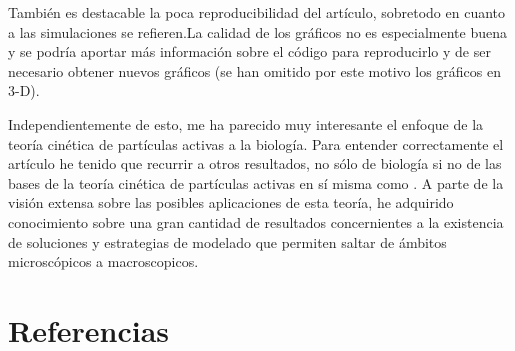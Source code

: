 \documentclass[1p]{elsarticle}
\begin{document}
También es destacable la poca reproducibilidad del artículo, sobretodo en cuanto a las simulaciones se refieren.La calidad de los gráficos no es especialmente buena y se podría aportar más información sobre el código para reproducirlo y de ser necesario obtener nuevos gráficos (se han omitido por este motivo los gráficos en 3-D).

Independientemente de esto, me ha parecido muy interesante el enfoque de la teoría cinética de partículas activas a la biología. Para entender correctamente el artículo he tenido que recurrir a otros resultados, no sólo de biología si no de las bases de la teoría cinética de partículas activas en sí misma como \cite{bellomo,libro}. A parte de la visión extensa sobre las posibles aplicaciones de esta teoría, he adquirido conocimiento sobre una gran cantidad de resultados concernientes a la existencia de soluciones y estrategias de modelado que permiten saltar de ámbitos microscópicos a macroscopicos. 

\section*{Referencias}


\end{document}
